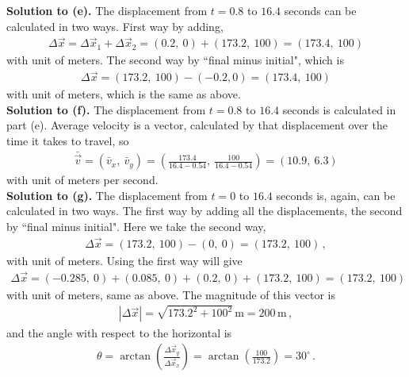 \documentclass[11pt]{article}
\begin{document}
\textbf{Solution to (e).} The displacement from $t=0.8$ to $16.4$ seconds can be calculated in two ways. First way by adding,
\begin{align*}
\Delta\vec{x} = \Delta\vec{x}_1 + \Delta\vec{x}_2 = (0.2,\ 0) + (173.2,\ 100) = (173.4,\ 100)
\end{align*}
with unit of meters. The second way by ``final minus initial", which is
\begin{align*}
\Delta\vec{x} = (173.2,\ 100) -(-0.2, 0) = (173.4,\ 100)
\end{align*}
with unit of meters, which is the same as above. \\

\textbf{Solution to (f).} The displacement from $t=0.8$ to $16.4$ seconds is calculated in part (e). Average velocity is a vector, calculated by that displacement over the time it takes to travel, so
\begin{align*}
\bar{\vec{v}} = (\bar{v}_x,\ \bar{v}_y) = \left( \frac{173.4}{16.4-0.54}, \ \frac{100}{16.4-0.54}\right) = \left(10.9,\ 6.3\right)
\end{align*}
with unit of meters per second.\\



\textbf{Solution to (g).} The displacement from $t = 0$ to $16.4$ seconds is, again, can be calculated in two ways. The first way by adding all the displacements, the second by ``final minus initial". Here we take the second way,
\begin{align*}
\Delta\vec{x} = (173.2,\ 100)- (0,\ 0) = (173.2,\ 100)\,,
\end{align*}
with unit of meters. Using the first way will give
\begin{align*}
\Delta\vec{x} = (-0.285,\ 0) + (0.085,\ 0) + (0.2,\ 0) + (173.2,\ 100) = (173.2,\ 100)
\end{align*}
with unit of meters, same as above. The magnitude of this vector is
\begin{align*}
|\Delta \vec{x}| = \sqrt{173.2^2 + 100^2}\,\text{m} = 200\,\text{m}\,,
\end{align*}
and the angle with respect to the horizontal is 
\begin{align*}
\theta =\arctan\left(\frac{\Delta\vec{x}_y}{\Delta \vec{x}_x}\right) =\arctan\left(\frac{100}{173.2}\right) = 30^\circ\,.
\end{align*}
\end{document}
